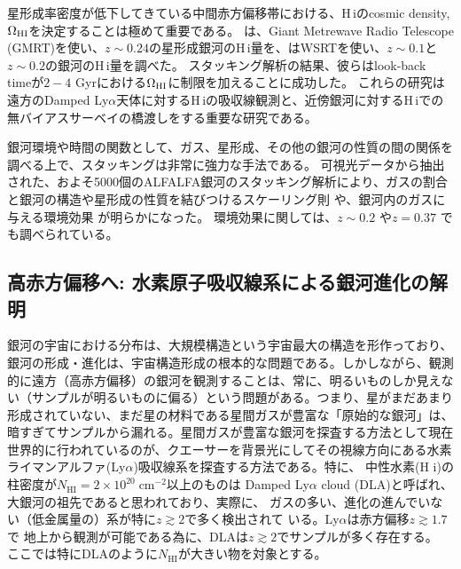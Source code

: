 星形成率密度が低下してきている中間赤方偏移帯における、H\,{\sc i}のcosmic density, $\Omega_{\rm HI}$を決定することは極めて重要である。
\citet{2007MNRAS.376.1357L}は、Giant Metrewave Radio Telescope (GMRT)を使い、$z\sim0.24$の星形成銀河のH\,{\sc i}量を、\citet{2013MNRAS.435.2693R}はWSRTを使い、$z\sim0.1$と$z\sim0.2$の銀河のH\,{\sc i}量を調べた。
スタッキング解析の結果、彼らはlook-back timeが$2-4$ Gyrにおける$\Omega_{\rm HI}$に制限を加えることに成功した。
これらの研究は遠方のDamped Ly$\alpha$天体に対するH\,{\sc i}の吸収線観測と、近傍銀河に対するH\,{\sc i}での無バイアスサーベイの橋渡しをする重要な研究である。


銀河環境や時間の関数として、ガス、星形成、その他の銀河の性質の間の関係を調べる上で、スタッキングは非常に強力な手法である。
可視光データから抽出された、およそ5000個のALFALFA銀河のスタッキング解析により、ガスの割合と銀河の構造や星形成の性質を結びつけるスケーリング則 \citep{2011MNRAS.411..993F} や、銀河内のガスに与える環境効果 \citep{2012MNRAS.427.2841F} が明らかになった。
環境効果に関しては、$z\sim0.2$ \citep{2007ApJ...668L...9V} や$z=0.37$ \citep{2009MNRAS.399.1447L}でも調べられている。



\subsection{高赤方偏移へ: 水素原子吸収線系による銀河進化の解明}\label{sec:DLA}

銀河の宇宙における分布は、大規模構造という宇宙最大の構造を形作っており、銀河の形成・進化は、宇宙構造形成の根本的な問題である。しかしながら、観測的に遠方（高赤方偏移）の銀河を観測することは、常に、明るいものしか見えない（サンプルが明るいものに偏る）という問題がある。つまり、星がまだあまり形成されていない、まだ星の材料である星間ガスが豊富な「原始的な銀河」は、暗すぎてサンプルから漏れる。星間ガスが豊富な銀河を探査する方法として現在世界的に行われているのが、クエーサーを背景光にしてその視線方向にある水素ライマンアルファ(Ly$\alpha$)吸収線系を探査する方法である。特に、
中性水素(H {\sc i})の柱密度が$N_\mathrm{HI} = 2\times 10^{20}\;  \mbox{cm}^{-2}$以上のものは
Damped Ly$\alpha$ cloud (DLA)と呼ばれ、大銀河の祖先であると思われており、実際に、
ガスの多い、進化の進んでいない（低金属量の）系が特に$z\gtrsim 2$で多く検出されて
いる\citep{2003MNRAS.346..209L}。Ly$\alpha$は赤方偏移$z\gtrsim 1.7$で
地上から観測が可能である為に、DLAは$z\gtrsim 2$でサンプルが多く存在する。
ここでは特にDLAのように$N_\mathrm{HI}$が大きい物を対象とする。

